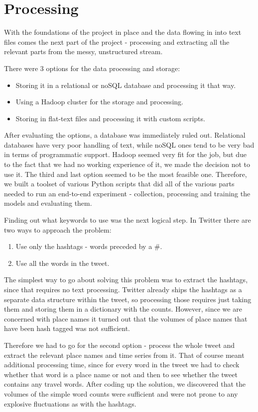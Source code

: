 \documentclass[minf,twoside,singlespacing,parskip,frontabs,notimes,12pt]{infthesis} %
\begin{document}
\section{Processing}


With the foundations of the project in place and the data flowing in into text files comes the next part of the project - processing and extracting all the relevant parts from the messy, unstructured stream. 

There were 3 options for the data processing and storage:
\begin{itemize}
\item Storing it in a relational or noSQL database and processing it that way. 
\item Using a Hadoop cluster for the storage and processing. 
\item Storing in flat-text files and processing it with custom scripts.
\end{itemize}

After evaluating the options, a database was immediately ruled out. Relational databases have very poor handling of text, while noSQL ones tend to be very bad in terms of programmatic support. Hadoop seemed very fit for the job, but due to the fact that we had no working experience of it, we made the decision not to use it. The third and last option seemed to be the most feasible one. Therefore, we built a toolset of various Python scripts that did all of the various parts needed to run an end-to-end experiment - collection, processing and training the models and evaluating them. 


Finding out what keywords to use was the next logical step. In Twitter there are two ways to approach the problem:
\begin{enumerate}
\item Use only the hashtags  - words preceded by a \#.
\item Use all the words in the tweet.
\end{enumerate}

The simplest way to go about solving this problem was to extract the hashtags, since that requires no text processing. Twitter already ships the hashtags as a separate data structure within the tweet, so processing those requires just taking them and storing them in a dictionary with the counts. However, since we are concerned with place names it turned out that the volumes of place names that have been hash tagged was not sufficient.

Therefore we had to go for the second option - process the whole tweet and extract the relevant place names and time series from it. That of course meant additional processing time, since for every word in the tweet we had to check whether that word is a place name or not and then to see whether the tweet contains any travel words. After coding up the solution, we discovered that the volumes of the simple word counts were sufficient and were not prone to any explosive fluctuations as with the hashtags.
\end{document}
